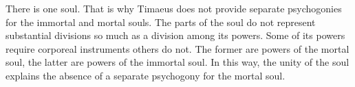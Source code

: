 There is one soul. That is why Timaeus does not provide separate psychogonies for the immortal and mortal souls. The parts of the soul do not represent substantial divisions so much as a division among its powers. Some of its powers require corporeal instruments others do not. The former are powers of the mortal soul, the latter are powers of the immortal soul. In this way, the unity of the soul explains the absence of a separate psychogony for the mortal soul.


